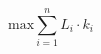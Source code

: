 \begin{equation} 
\text{max} \sum_{i=1}^{n} L_i \cdot k_i
	\label{ch-introduction:equ:max_loads}
\end{equation}